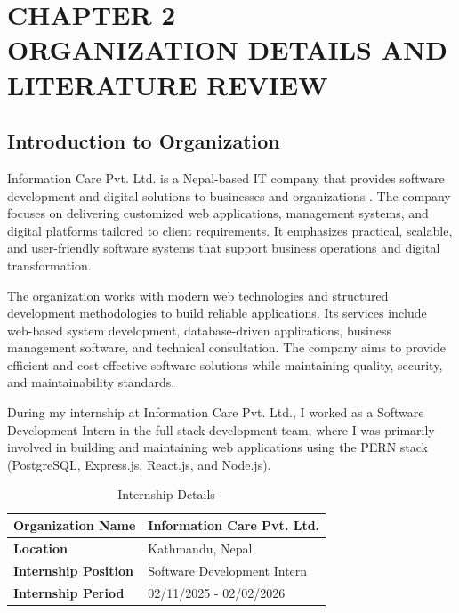\section*{\Large\centering \textbf{ CHAPTER 2 \\ ORGANIZATION DETAILS AND LITERATURE REVIEW }}
\setcounter{section}{2}
\setcounter{subsection}{0}

\subsection{Introduction to Organization}

Information Care Pvt. Ltd. is a Nepal-based IT company that provides software development and digital solutions to businesses and organizations \parencite{infocare_nepal_website}. The company focuses on delivering customized web applications, management systems, and digital platforms tailored to client requirements. It emphasizes practical, scalable, and user-friendly software systems that support business operations and digital transformation.

The organization works with modern web technologies and structured development methodologies to build reliable applications. Its services include web-based system development, database-driven applications, business management software, and technical consultation. The company aims to provide efficient and cost-effective software solutions while maintaining quality, security, and maintainability standards.

During my internship at Information Care Pvt. Ltd., I worked as a Software Development Intern in the full stack development team, where I was primarily involved in building and maintaining web applications using the PERN stack (PostgreSQL, Express.js, React.js, and Node.js).

\begin{table}[H]
    \centering
    \caption{Internship Details}
    \label{tab:internship_details}
    \begin{tabular}{|l|l|}
        \hline
        \textbf{Organization Name} & Information Care Pvt. Ltd. \\
        \hline
        \textbf{Location} & Kathmandu, Nepal \\
        \hline
        \textbf{Internship Position} & Software Development Intern \\
        \hline
        \textbf{Internship Period} & 02/11/2025 - 02/02/2026 \\
        \hline
    \end{tabular}
\end{table}

